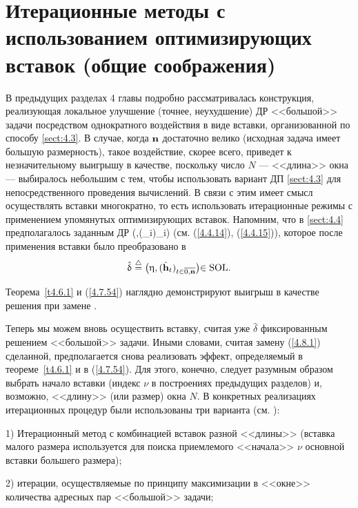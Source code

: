 
\section{
  Итерационные методы с использованием оптимизирующих вставок
  (общие соображения)
}
\label{sect:4.8}
\setcounter{equation}{-1}

В предыдущих разделах 4 главы подробно рассматривалась конструкция,
реализующая локальное улучшение
(точнее, неухудшение)
ДР <<большой>> задачи посредством однократного воздействия в виде вставки,
организованной по способу \ref{sect:4.3}.
В случае, когда ${\mathbf n}$ достаточно велико
(исходная задача имеет большую размерность),
такое воздействие, скорее всего,
приведет к незначительному выигрышу в качестве,
поскольку число $N$ --- <<длина>> окна ---
выбиралось небольшим с тем, чтобы использовать вариант ДП \ref{sect:4.3}
для непосредственного проведения вычислений.
В связи с этим имеет смысл  осуществлять вставки многократно,
то есть использовать итерационные режимы с применением
упомянутых оптимизирующих вставок.
Напомним, что в \ref{sect:4.4}
предполагалось заданным ДР
\bfn
  \label{4.8.0}
  \delta\df \bigl(\la,(_i)_{i\in{}}\bigl)\in {}
\efn
(см. (\ref{4.4.14}), (\ref{4.4.15})),
которое после применения вставки было преобразовано в
$$
  \hat{\delta}\df \bigl(\eta,(\hat{\mathbf{h}}_t)_{t\in\ov{0,\nn}}\bigl)\in \mathrm{SOL}
  .
$$

Теорема~\ref{t4.6.1} и
(\ref{4.7.54}) наглядно демонстрируют выигрыш в качестве решения при замене
\bfn
  \label{4.8.1}
  \delta \longrightarrow \hat{\delta}
  .
\efn

Теперь мы можем вновь осуществить вставку,
считая уже $\hat{\delta}$
фиксированным решением <<большой>> задачи.
Иными словами, считая замену (\ref{4.8.1}) сделанной,
предполагается снова реализовать эффект,
определяемый в теореме~\ref{t4.6.1} и в (\ref{4.7.54}).
Для этого, конечно,
следует разумным образом выбрать начало вставки
(индекс $\nu$ в построениях предыдущих разделов)
и, возможно, <<длину>> (или размер) окна $N.$
В конкретных реализациях итерационных процедур были
использованы три варианта (см. \cite{Cha18`}):

1) Итерационный метод с комбинацией вставок разной <<длины>>
(вставка малого размера используется
для поиска приемлемого <<начала>> $\nu$
основной вставки большего размера);

2) итерации, осуществляемые  по принципу максимизации в <<окне>>
количества адресных пар <<большой>> задачи;


